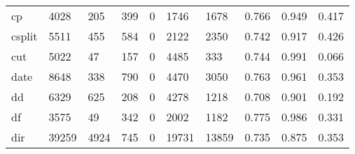 \begin{longtable}{lp{2.0cm}p{2.0cm}p{2.0cm}p{2.0cm}p{2.0cm}p{2.0cm}p{2.0cm}p{2.0cm}p{2.0cm}}
cp        &                   4028 &                                205 &                               399 &                                0 &                              1746 &                            1678 &                                   0.766 &                                  0.949 &                                0.417 \\
csplit    &                   5511 &                                455 &                               584 &                                0 &                              2122 &                            2350 &                                   0.742 &                                  0.917 &                                0.426 \\
cut       &                   5022 &                                 47 &                               157 &                                0 &                              4485 &                             333 &                                   0.744 &                                  0.991 &                                0.066 \\
date      &                   8648 &                                338 &                               790 &                                0 &                              4470 &                            3050 &                                   0.763 &                                  0.961 &                                0.353 \\
dd        &                   6329 &                                625 &                               208 &                                0 &                              4278 &                            1218 &                                   0.708 &                                  0.901 &                                0.192 \\
df        &                   3575 &                                 49 &                               342 &                                0 &                              2002 &                            1182 &                                   0.775 &                                  0.986 &                                0.331 \\
dir       &                  39259 &                               4924 &                               745 &                                0 &                             19731 &                           13859 &                                   0.735 &                                  0.875 &                                0.353 \\

\end{longtable}
